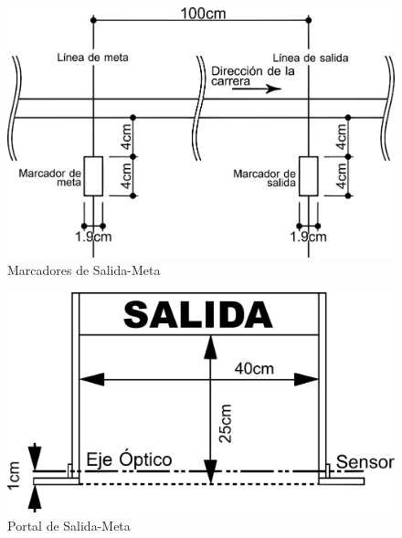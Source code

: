\begin{figure}[H]
  \centering
  \includegraphics[width=0.6\linewidth]{./images/rules/figure5.png}
  \caption{Marcadores de Salida-Meta}
\end{figure}

\begin{figure}[H]
  \centering
  \includegraphics[width=0.6\linewidth]{./images/rules/figure6.png}
  \caption{Portal de Salida-Meta}
\end{figure}




